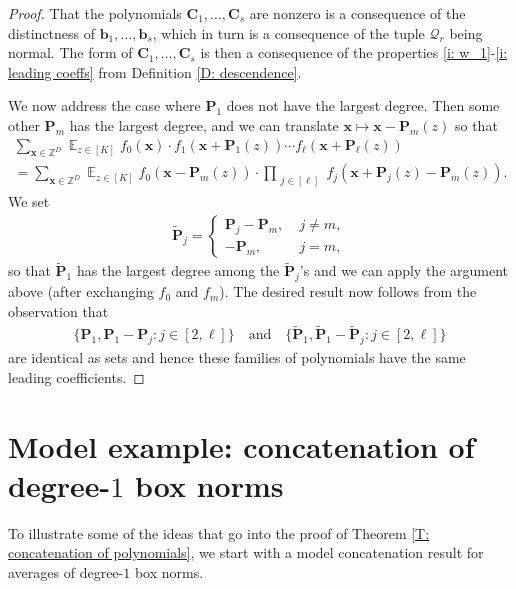 \documentclass[11pt]{amsart}
\theoremstyle{definition}
\DeclareMathOperator*{\E}{\mathbb{E}}
\newcommand{\Z}{{\mathbb Z}}
\newcommand{\CQ}{{\mathcal Q}}
\renewcommand{\b}{{\textbf{b}}}
\newcommand{\bc}{{\textbf{C}}}
\newcommand{\p}{{\textbf{P}}}
\newcommand{\bx}{{\textbf{x}}}
\begin{document}
\begin{proof}
    That the polynomials $\bc_1, \ldots, \bc_s$ are nonzero is a consequence of the distinctness of $\b_{1}, \ldots, \b_{s}$, which in turn is a consequence of the tuple $\CQ_r$ being normal. The form of $\bc_1, \ldots, \bc_s$ is then a consequence of the properties \eqref{i: w_1}-\eqref{i: leading coeffs} from Definition \ref{D: descendence}.


    
    We now address the case where $\p_1$ does not have the largest degree.  Then some other $\p_m$ has the largest degree, and we can translate $\bx\mapsto \bx-\p_m(z)$ so that
    \begin{multline*}
        \sum_{\bx\in\Z^D}\E_{z\in[K]}
        f_0(\bx)\cdot f_1(\bx+\p_1(z))\cdots f_\ell(\bx+\p_\ell(z))\\
        = \sum_{\bx\in\Z^D}\E_{z\in[K]} 
        f_0(\bx-\p_m(z))\cdot \prod_{\substack{j\in[\ell]}} f_j(\bx+\p_j(z)-\p_m(z)).
    \end{multline*}
    We set
    \begin{align*}
        \tilde{\p}_j = \begin{cases} \p_j - \p_m,\; &j\neq m,\\
        -\p_m,\; & j = m,
        \end{cases}
    \end{align*}
   so that $\tilde{\p}_1$ has the largest degree among the $\tilde{\p}_j$'s and we can apply the argument above (after exchanging $f_0$ and $f_m$).  The desired result now follows from the observation that
    \begin{align}\label{E: collections of polys}
        \{\p_1, \p_1-\p_j: j\in[2,\ell]\} \quad\textrm{and}\quad \{\tilde{\p}_1, \tilde{\p}_1-\tilde{\p}_j: j\in[2,\ell]\}
    \end{align}
    are identical as sets and hence these families of polynomials have the same leading coefficients. 
  \end{proof}


\section{Model example: concatenation of degree-$1$ box norms}\label{S: model}

To illustrate some of the ideas that go into the proof of Theorem \ref{T: concatenation of polynomials}, we start with a model concatenation result for averages of degree-$1$ box norms.
\end{document}
